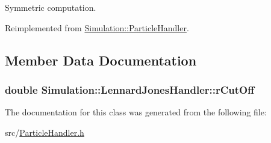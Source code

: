 Symmetric computation. 



Reimplemented from \hyperlink{classSimulation_1_1ParticleHandler_a4a1caeb40ada4f410fec9244bda4af69}{Simulation\-::\-Particle\-Handler}.



\subsection{Member Data Documentation}
\hypertarget{classSimulation_1_1LennardJonesHandler_af8e31fb6a5016a95b8d91593822f383e}{
\subsubsection[{r\-Cut\-Off}]{\setlength{\rightskip}{0pt plus 5cm}double Simulation\-::\-Lennard\-Jones\-Handler\-::r\-Cut\-Off\hspace{0.3cm}{\ttfamily [private]}}}\label{classSimulation_1_1LennardJonesHandler_af8e31fb6a5016a95b8d91593822f383e}


The documentation for this class was generated from the following file\-:\begin{DoxyCompactItemize}
\item 
src/\hyperlink{ParticleHandler_8h}{Particle\-Handler.\-h}\end{DoxyCompactItemize}

